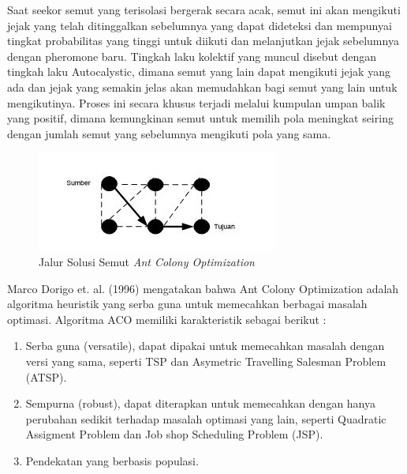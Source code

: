 \documentclass[a4paper,twoside]{article}
\begin{document}
\begin{enumerate}
\begin{itemize}
		Saat seekor semut yang terisolasi bergerak secara acak, semut ini akan mengikuti jejak yang telah ditinggalkan sebelumnya yang dapat dideteksi dan mempunyai tingkat probabilitas yang tinggi untuk diikuti dan melanjutkan jejak sebelumnya dengan pheromone baru. Tingkah laku kolektif yang muncul disebut dengan tingkah laku Autocalystic, dimana semut yang lain dapat mengikuti jejak yang ada dan jejak yang semakin jelas akan memudahkan bagi semut yang lain untuk mengikutinya. Proses ini secara khusus terjadi melalui kumpulan umpan balik yang positif, dimana kemungkinan semut untuk memilih pola meningkat seiring dengan jumlah semut yang sebelumnya mengikuti pola yang sama.
		
 		\begin{figure}[H]
			\centering
			\includegraphics[scale=0.80]{gambar4}
			\caption[Jalur Solusi Semut] {Jalur Solusi Semut {\it Ant Colony Optimization}}
			\label{fig:JaluSolusiSemut}
		\end{figure}
		
		Marco Dorigo et. al. (1996) mengatakan bahwa Ant Colony Optimization adalah algoritma heuristik yang serba guna untuk memecahkan berbagai masalah optimasi. Algoritma ACO memiliki karakteristik sebagai berikut :
		\begin{enumerate}
			\item Serba guna (versatile), dapat dipakai untuk memecahkan masalah dengan versi yang sama, seperti TSP dan Asymetric Travelling Salesman Problem (ATSP).
			\item Sempurna (robust), dapat diterapkan untuk memecahkan dengan hanya perubahan sedikit terhadap masalah optimasi yang lain, seperti Quadratic Assigment Problem dan Job shop Scheduling Problem (JSP).
			\item Pendekatan yang berbasis populasi.
		\end{enumerate}
		\end{itemize}	
		

\end{enumerate}
\end{document}
